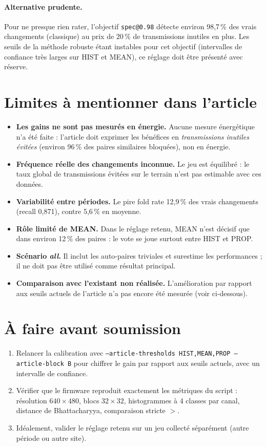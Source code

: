 \documentclass[11pt,a4paper]{article}
\begin{document}
	\paragraph{Alternative prudente.} Pour ne presque rien rater, l'objectif \texttt{spec@0.98} détecte environ 98,7\,\% des vrais
	changements (classique) au prix de 20\,\% de transmissions inutiles en plus. Les seuils de la méthode robuste étant
	instables pour cet objectif (intervalles de confiance très larges sur HIST et MEAN), ce réglage doit être présenté avec réserve.
	
	\section{Limites à mentionner dans l'article}
	\begin{itemize}
		\item \textbf{Les gains ne sont pas mesurés en énergie.} Aucune mesure énergétique n'a été faite : l'article doit
		exprimer les bénéfices en \emph{transmissions inutiles évitées} (environ 96\,\% des paires similaires bloquées), non en énergie.
		\item \textbf{Fréquence réelle des changements inconnue.} Le jeu est équilibré : le taux global de transmissions
		évitées sur le terrain n'est pas estimable avec ces données.
		\item \textbf{Variabilité entre périodes.} Le pire fold rate 12,9\,\% des vrais changements (recall 0,871), contre 5,6\,\%
		en moyenne.
		\item \textbf{Rôle limité de MEAN.} Dans le réglage retenu, MEAN n'est décisif que dans environ 12\,\% des paires : le vote
		se joue surtout entre HIST et PROP.
		\item \textbf{Scénario \textit{all}.} Il inclut les auto-paires triviales et surestime les performances ; il ne doit pas
		être utilisé comme résultat principal.
		\item \textbf{Comparaison avec l'existant non réalisée.} L'amélioration par rapport aux seuils actuels de l'article n'a pas encore
		été mesurée (voir ci-dessous).
	\end{itemize}
	
	\section{À faire avant soumission}
	\begin{enumerate}[nosep]
		\item Relancer la calibration avec \texttt{--article-thresholds HIST,MEAN,PROP --article-block B} pour chiffrer le gain par
		rapport aux seuils actuels, avec un intervalle de confiance.
		\item Vérifier que le firmware reproduit exactement les métriques du script : résolution $640\times480$, blocs $32\times32$,
		histogrammes à 4 classes par canal, distance de Bhattacharyya, comparaison stricte $>$.
		\item Idéalement, valider le réglage retenu sur un jeu collecté séparément (autre période ou autre site).
	\end{enumerate}
	
\end{document}
